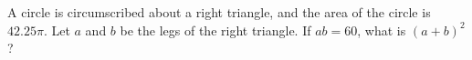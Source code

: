 A circle is circumscribed about a right triangle, and the area of the circle is $42.25\pi$. Let $a$ and $b$ be the legs of the right triangle. If $ab=60$, what is $(a+b)^2$?
